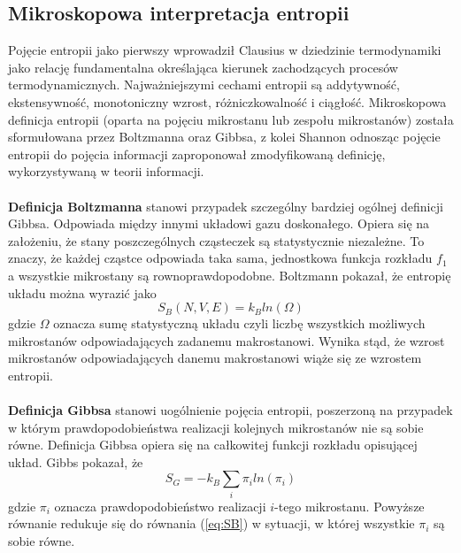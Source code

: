 \documentclass[12pt,a4paper,openright]{report} %
\begin{document}
\subsection{Mikroskopowa interpretacja entropii}
Pojęcie entropii jako pierwszy wprowadził Clausius w dziedzinie termodynamiki jako relację fundamentalna określająca kierunek zachodzących procesów termodynamicznych. Najważniejszymi cechami entropii są addytywność, ekstensywność, monotoniczny wzrost, różniczkowalność i ciągłość. Mikroskopowa definicja entropii (oparta na pojęciu mikrostanu lub zespołu mikrostanów) została sformułowana przez Boltzmanna oraz Gibbsa, z kolei Shannon odnosząc pojęcie entropii do pojęcia informacji zaproponował zmodyfikowaną definicję, wykorzystywaną w teorii informacji.\\
\\
\textbf{Definicja Boltzmanna} stanowi przypadek szczególny bardziej ogólnej definicji Gibbsa. Odpowiada między innymi układowi gazu doskonałego. Opiera się na założeniu, że stany poszczególnych cząsteczek są statystycznie niezależne. To znaczy, że każdej cząstce odpowiada taka sama, jednostkowa funkcja rozkładu $f_1$ a wszystkie mikrostany są rownoprawdopodobne. %
Boltzmann pokazał, że entropię układu można wyrazić jako
\begin{equation}
S_B(N, V, E)=k_B ln(\Omega)
\label{eq:SB}
\end{equation}
gdzie $\Omega$ oznacza sumę statystyczną układu czyli liczbę wszystkich możliwych mikrostanów odpowiadających zadanemu makrostanowi. Wynika stąd, że wzrost mikrostanów odpowiadających danemu makrostanowi wiąże się ze wzrostem entropii. 
\\
\\
\textbf{Definicja Gibbsa} stanowi uogólnienie pojęcia entropii, poszerzoną na przypadek w którym prawdopodobieństwa realizacji kolejnych mikrostanów nie są sobie równe. Definicja Gibbsa opiera się na całkowitej funkcji rozkładu opisującej układ. Gibbs pokazał, że 
\begin{equation}
S_G=-k_B \sum \limits_{i} \pi_i ln(\pi_i)
\label{eq:SG}
\end{equation}
gdzie $\pi_i$ oznacza prawdopodobieństwo realizacji $i$-tego mikrostanu. Powyższe równanie redukuje się do równania (\ref{eq:SB}) w sytuacji, w której wszystkie $\pi_i$ są sobie równe.\\
\end{document}
